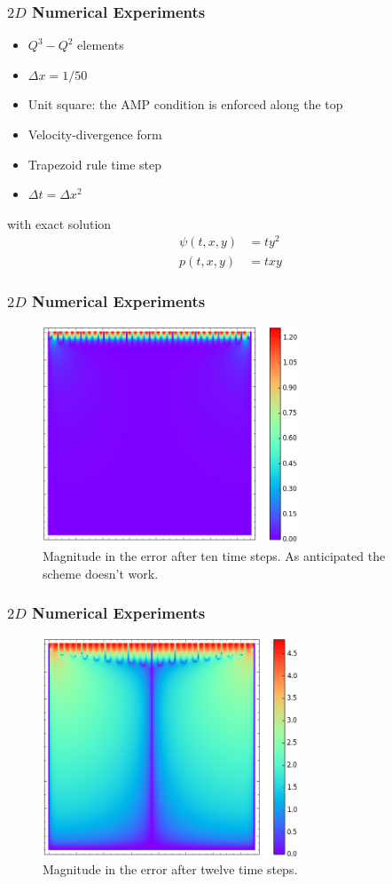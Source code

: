 \documentclass[8pt]{beamer}
\begin{document}
\begin{frame}
    \frametitle{\(2D\) Numerical Experiments}
    \begin{itemize}
        \item \(Q^3-Q^2\) elements
        \item \(\Delta x = 1/50\)
        \item Unit square: the AMP condition is enforced along the top
        \item Velocity-divergence form
        \item Trapezoid rule time step
        \item \(\Delta t = \Delta x^2\)
    \end{itemize}
    with exact solution
    \begin{align}
        \psi(t, x, y) &= t y^2                                                \\
        p(t, x, y)    &= t x y
    \end{align}
\end{frame}

\begin{frame}
    \frametitle{\(2D\) Numerical Experiments}
    \begin{figure}
        \centering
        \includegraphics[width=3in]{v1-10.png}

        \caption{Magnitude in the error after ten time steps. As anticipated the
        scheme doesn't work.}
    \end{figure}
\end{frame}

\begin{frame}
    \frametitle{\(2D\) Numerical Experiments}
    \begin{figure}
        \centering
        \includegraphics[width=3in]{v1-12.png}

        \caption{Magnitude in the error after twelve time steps.}
    \end{figure}
\end{frame}
\end{document}
